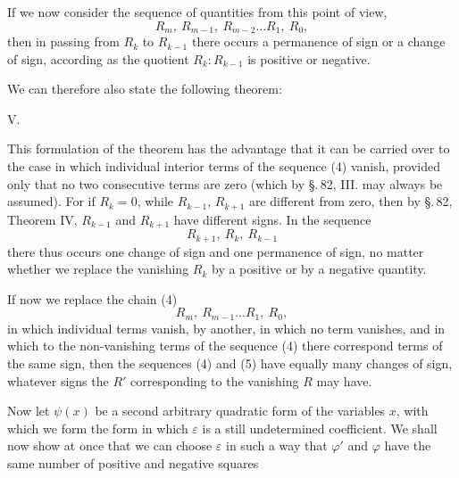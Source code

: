 
If we now consider the sequence of quantities from this point of view,
\[
R_m,\ R_{m-1},\ R_{m-2} \ldots R_1,\ R_0,
\]
then in passing from $R_k$ to $R_{k-1}$ there occurs a permanence of sign or a change of sign, according as the quotient $R_k : R_{k-1}$ is positive or negative.

We can therefore also state the following theorem:

V.\ 

This formulation of the theorem has the advantage that it can be carried over to the case in which individual interior terms of the sequence (4) vanish, provided only that no two consecutive terms are zero (which by \S.\,82, III. may always be assumed). For if $R_k = 0$, while $R_{k-1}$, $R_{k+1}$ are different from zero, then by \S.\,82, Theorem IV, $R_{k-1}$ and $R_{k+1}$ have different signs. In the sequence
\[
R_{k+1},\ R_k,\ R_{k-1}
\]
there thus occurs one change of sign and one permanence of sign, no matter whether we replace the vanishing $R_k$ by a positive or by a negative quantity.

If now we replace the chain (4)
\[
R_m,\ R_{m-1} \ldots R_1,\ R_0,
\]
in which individual terms vanish, by another,
in which no term vanishes, and in which to the non-vanishing terms of the sequence (4) there correspond terms of the same sign, then the sequences (4) and (5) have equally many changes of sign, whatever signs the $R'$ corresponding to the vanishing $R$ may have.

Now let $\psi(x)$ be a second arbitrary quadratic form of the variables $x$, with which we form the form
in which $\varepsilon$ is a still undetermined coefficient. We shall now show at once that we can choose $\varepsilon$ in such a way that $\varphi'$ and $\varphi$ have the same number of positive and negative squares
